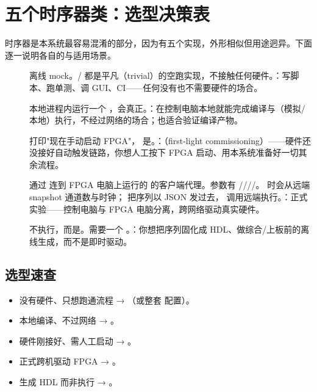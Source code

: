 \documentclass[11pt,oneside,openany]{book}
\begin{document}
\section{五个时序器类：选型决策表}

时序器是本系统最容易混淆的部分，因为有五个实现，外形相似但用途迥异。下面逐一说明各自的与适用场景。

\begin{description}
\item[] 离线 mock。/ 都是平凡（trivial）的空跑实现，不接触任何硬件。：写脚本、跑单测、调 GUI、CI——任何没有也不需要硬件的场合。
\item[] 本地进程内运行一个 ，会真正。：在控制电脑本地就能完成编译与（模拟/本地）执行，不经过网络的场合；也适合验证编译产物。
\item[] 打印"现在手动启动 FPGA"， 是。：（first-light commissioning）——硬件还没接好自动触发链路，你想人工按下 FPGA 启动、用本系统准备好一切其余流程。
\item[] 通过  连到 FPGA 电脑上运行的  的客户端代理。参数有 ////。 时会从远端 snapshot 通道数与时钟； 把序列以 JSON 发过去， 调用远端执行。：正式实验——控制电脑与 FPGA 电脑分离，跨网络驱动真实硬件。
\item[] 不执行，而是。需要一个 。：你想把序列固化成 HDL、做综合/上板前的离线生成，而不是即时驱动。
\end{description}

\subsection{选型速查}

\begin{itemize}
\item 没有硬件、只想跑通流程 → （或整套  配置）。
\item 本地编译、不过网络 → 。
\item 硬件刚接好、需人工启动 → 。
\item 正式跨机驱动 FPGA → 。
\item 生成 HDL 而非执行 → 。
\end{itemize}
\end{document}
